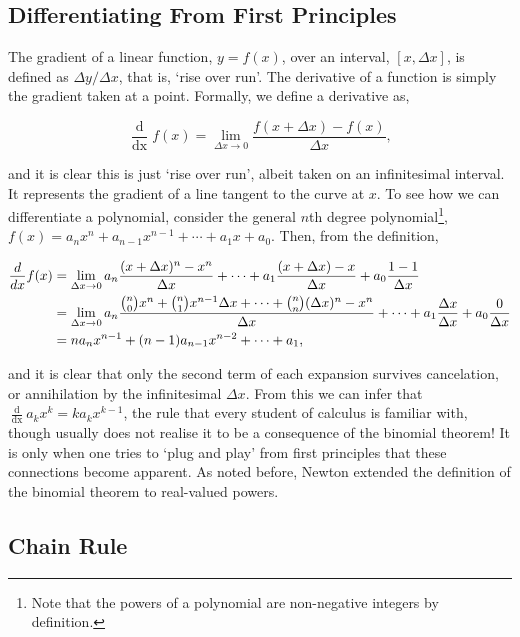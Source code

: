 \documentclass[11pt]{amsart}
\begin{document}
\subsection{Differentiating From First Principles}

The gradient of a linear function, $y = f(x)$, over an interval, $[x, \Delta x]$, is defined as $\Delta y / \Delta x$, that is, `rise over run'. The derivative of a function is simply the gradient taken at a point. Formally, we define a derivative as,

$$\frac{\mathop{d}}{\mathop{dx}} f(x) = \lim_{\Delta x \to 0} \frac{f(x  + \Delta x) - f(x)}{\Delta x},$$

and it is clear this is just `rise over run', albeit taken on an infinitesimal interval. It represents the gradient of a line tangent to the curve at $x$. To see how we can differentiate a polynomial, consider the general $n$th degree polynomial\footnote{Note that the powers of a polynomial are non-negative integers by definition.}, $f(x) = a_nx^n + a_{n-1}x^{n-1} + \cdots + a_1x + a_0$. Then, from the definition,

\begin{align}
\frac{\mathop{d}}{\mathop{dx}} f(x) &= \lim_{\Delta x \to 0} a_n\frac{(x + \Delta x)^n - x^n}{\Delta x} + \cdots + a_1\frac{(x + \Delta x) - x}{\Delta x} + a_0\frac{1 - 1}{\Delta x}\notag \\
&= \lim_{\Delta x \to 0} a_n\frac{{{n}\choose{0}}x^n + {{n}\choose{1}}x^{n-1}\Delta x + \cdots + {{n}\choose{n}}(\Delta x)^n - x^n}{\Delta x} + \cdots + a_1\frac{\Delta x}{\Delta x} + a_0\frac{0}{\Delta x} \notag \\
&= na_nx^{n-1} + (n-1)a_{n-1}x^{n-2} + \cdots + a_1, \notag
\end{align}

and it is clear that only the second term of each expansion survives cancelation, or annihilation by the infinitesimal $\Delta x$. From this we can infer that $\frac{\mathop{d}}{\mathop{dx}} a_kx^k = ka_kx^{k-1}$, the rule that every student of calculus is familiar with, though usually does not realise it to be a consequence of the binomial theorem! It is only when one tries to `plug and play' from first principles that these connections become apparent. As noted before, Newton extended the definition of the binomial theorem to real-valued powers.

\subsection{Chain Rule}
\end{document}
